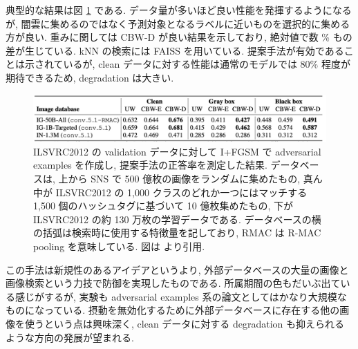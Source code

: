 典型的な結果は図 \ref{fig:defense-against-adversarial-result-table} である.
データ量が多いほど良い性能を発揮するようになるが, 闇雲に集めるのではなく予測対象となるラベルに近いものを選択的に集める方が良い.
重みに関しては CBW-D が良い結果を示しており, 絶対値で数 \% もの差が生じている.
kNN の検索には FAISS \cite{johnson2019billion} を用いている.
提案手法が有効であることは示されているが, clean データに対する性能は通常のモデルでは 80\% 程度が期待できるため, degradation は大きい.
%
\begin{figure}[htbp]
\begin{center}
\includegraphics[width=14.0cm]{figures/defense-against-adversarial-result-table.pdf}
\end{center}
\caption{
ILSVRC2012 の validation データに対して I+FGSM で adversarial examples を作成し, 提案手法の正答率を測定した結果.
データベースは, 上から SNS で 500 億枚の画像をランダムに集めたもの, 真ん中が ILSVRC2012 の 1,000 クラスのどれか一つにはマッチする 1,500 個のハッシュタグに基づいて 10 億枚集めたもの, 下が ILSVRC2012 の約 130 万枚の学習データである.
データベースの横の括弧は検索時に使用する特徴量を記しており, RMAC は R-MAC pooling \cite{tolias2015particular} を意味している.
図は \cite{dubey2019defense} より引用.
}
\label{fig:defense-against-adversarial-result-table}
\end{figure}
%

この手法は新規性のあるアイデアというより, 外部データベースの大量の画像と画像検索という力技で防御を実現したものである.
所属期間の色もだいぶ出ている感じがするが, 実験も adversarial examples 系の論文としてはかなり大規模なものになっている.
摂動を無効化するために外部データベースに存在する他の画像を使うという点は興味深く, clean データに対する degradation も抑えられるような方向の発展が望まれる.

